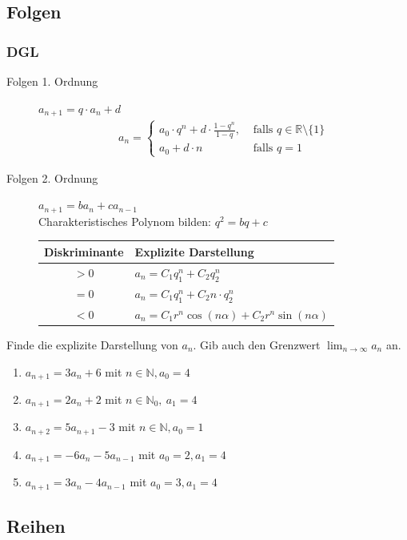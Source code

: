 \documentclass[11pt, a4paper]{article}
\begin{document}
\subsection{Folgen}
\subsubsection{DGL}
\begin{description}
	\item[Folgen 1. Ordnung] $a_{n+1} = q \cdot a_n + d$
		\begin{align*}
			a_n = \begin{cases}
				a_0 \cdot q^n + d \cdot \frac{1-q^n}{1-q}, &\text{ falls } q \in \mathbb{R} \setminus \{1\} \\
				a_0 + d \cdot n &\text{ falls } q=1
					\end{cases}
		\end{align*}
	\item[Folgen 2. Ordnung] $a_{n+1} = b a_n + c a_{n-1}$ \vspace{0.3cm} \\
		Charakteristisches Polynom bilden: $q^2 = bq+c$ \vspace{0.3cm} \\
		\begin{tabular}{|c|l|}
			\hline
			Diskriminante & Explizite Darstellung \\ \hline
			$>0$ & $a_n = C_1 q_1^n + C_2 q_2^n$ \\
			$=0$ & $a_n = C_1 q_1^n + C_2 n \cdot q_2^n$ \\
			$<0$ & $a_n = C_1 r^n \cos(n\alpha) + C_2 r^n \sin(n\alpha)$ \\ \hline
		\end{tabular}
\end{description}
Finde die explizite Darstellung von $a_n$. Gib auch den Grenzwert $\lim_{n \rightarrow \infty} a_n$ an.
\begin{enumerate}
	\item $a_{n+1} = 3 a_n + 6$ mit $n \in \mathbb{N}, a_0 = 4$
	\item $a_{n+1} = 2 a_n +2$ mit $n \in \mathbb{N}_0,\ a_1 = 4$
	\item $a_{n+2} = 5 a_{n+1} - 3$ mit $n \in \mathbb{N}, a_0 = 1$
	\item $a_{n+1} = -6 a_{n} - 5 a_{n-1}$ mit $a_0=2, a_1=4$
	\item $a_{n+1} = 3 a_n - 4 a_{n-1}$ mit $a_0=3, a_1=4$
\end{enumerate}

\subsection{Reihen}
\end{document}
